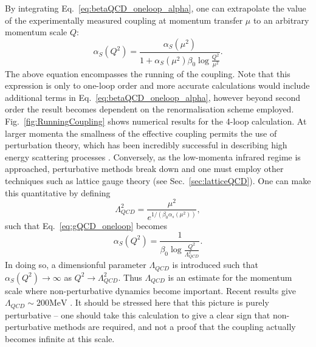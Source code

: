 \documentclass[11pt, a4paper, twoside]{book}
\newcommand{\brac}[1] {\!\left(#1\right)}
\begin{document}
By integrating Eq.~\eqref{eq:betaQCD_oneloop_alpha}, one can extrapolate the value of the experimentally measured coupling at momentum transfer \(\mu\) to an arbitrary momentum scale \(Q\):
\begin{equation}
\label{eq:gQCD_oneloop}
\alpha_S\brac{Q^2}=\frac{\alpha_S\brac{\mu^2}}{1+\alpha_S\brac{\mu^2}\beta_0\log\frac{Q^2}{\mu^2}}.
\end{equation}
The above equation encompasses the running of the coupling. Note that this expression is only to one-loop order and more accurate calculations would include additional terms in Eq.~\eqref{eq:betaQCD_oneloop_alpha}, however beyond second order the result becomes dependent on the renormalisation scheme employed. Fig.~\ref{fig:RunningCoupling} shows numerical results for the 4-loop calculation. At larger momenta the smallness of the effective coupling permits the use of perturbation theory, which has been incredibly successful in describing high energy scattering processes \cite{Bethke:2006ac}. Conversely, as the low-momenta infrared regime is approached, perturbative methods break down and one must employ other techniques such as lattice gauge theory (see Sec.~\ref{sec:latticeQCD}). One can make this quantitative by defining 
\begin{equation}
\label{eq:|ambdaQCD}
\Lambda_{QCD}^2=\frac{\mu^2}{e^{1/\brac{\beta_0\alpha_s\brac{\mu^2}}}},
\end{equation}
such that Eq.~\ref{eq:gQCD_oneloop} becomes
\begin{equation}
\label{eq:gQCD_oneloop_new}
\alpha_S\brac{Q^2}=\frac{1}{\beta_0\log\frac{Q^2}{\Lambda_{QCD}^2}}.
\end{equation}
In doing so, a dimensionful parameter \(\Lambda_{QCD}\) is introduced such that \(\alpha_S\brac{Q^2}\to\infty\) as \(Q^2\to\Lambda_{QCD}^2\). Thus \(\Lambda_{QCD}\) is an estimate for the momentum scale where non-perturbative dynamics become important. Recent results give \(\Lambda_{QCD}\sim 200\mathrm{MeV}\) \cite{Bethke:2009jm}. It should be stressed here that this picture is purely perturbative -- one should take this calculation to give a clear sign that non-perturbative methods are required, and not a proof that the coupling actually becomes infinite at this scale.
\end{document}
